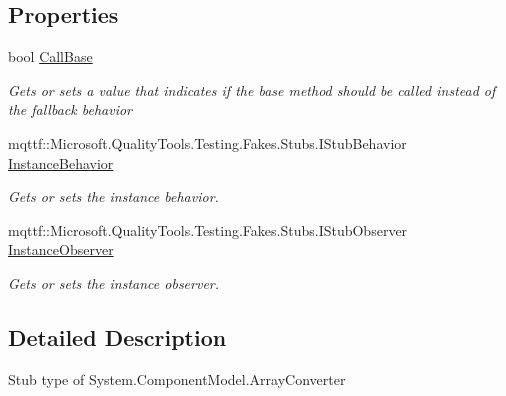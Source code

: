 \subsection*{Properties}
\begin{DoxyCompactItemize}
\item 
bool \hyperlink{class_system_1_1_component_model_1_1_fakes_1_1_stub_array_converter_a6eb9adeb705f27e700417a3f5cd60673}{Call\-Base}
\begin{DoxyCompactList}\small\item\em Gets or sets a value that indicates if the base method should be called instead of the fallback behavior\end{DoxyCompactList}\item 
mqttf\-::\-Microsoft.\-Quality\-Tools.\-Testing.\-Fakes.\-Stubs.\-I\-Stub\-Behavior \hyperlink{class_system_1_1_component_model_1_1_fakes_1_1_stub_array_converter_af232904ee982c7df54417ed50b02d6ef}{Instance\-Behavior}
\begin{DoxyCompactList}\small\item\em Gets or sets the instance behavior.\end{DoxyCompactList}\item 
mqttf\-::\-Microsoft.\-Quality\-Tools.\-Testing.\-Fakes.\-Stubs.\-I\-Stub\-Observer \hyperlink{class_system_1_1_component_model_1_1_fakes_1_1_stub_array_converter_a2bedc2207b5bebb9d7e48741c9bd1366}{Instance\-Observer}
\begin{DoxyCompactList}\small\item\em Gets or sets the instance observer.\end{DoxyCompactList}\end{DoxyCompactItemize}


\subsection{Detailed Description}
Stub type of System.\-Component\-Model.\-Array\-Converter



